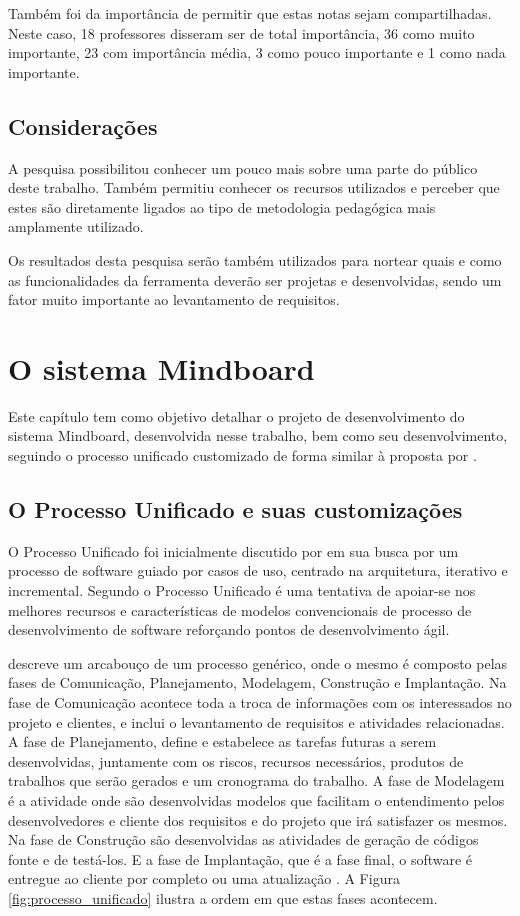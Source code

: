Também foi da importância de permitir que estas notas sejam compartilhadas. Neste caso, 18 professores disseram ser de total importância, 36 como muito importante, 23 com importância média, 3 como pouco importante e 1 como nada importante.

\section{Considerações}

A pesquisa possibilitou conhecer um pouco mais sobre uma parte do público deste trabalho. Também permitiu conhecer os recursos utilizados e perceber que estes são diretamente ligados ao tipo de metodologia pedagógica mais amplamente utilizado.

Os resultados desta pesquisa serão também utilizados para nortear quais e como as funcionalidades da ferramenta deverão ser projetas e desenvolvidas, sendo um fator muito importante ao levantamento de requisitos.


\chapter{O sistema Mindboard}
\label{cap:mindboard}

Este capítulo tem como objetivo detalhar o projeto de desenvolvimento do sistema Mindboard, desenvolvida nesse trabalho, bem como seu desenvolvimento, seguindo o processo unificado customizado de forma similar à proposta por .

\section{O Processo Unificado e suas customizações}

O Processo Unificado foi inicialmente discutido por  em sua busca por um processo de software guiado por casos de uso, centrado na arquitetura, iterativo e incremental. Segundo  o Processo Unificado é uma tentativa de apoiar-se nos melhores recursos e características de modelos convencionais de processo de desenvolvimento de software reforçando pontos de desenvolvimento ágil.

 descreve um arcabouço de um processo genérico, onde o mesmo é composto pelas fases de Comunicação, Planejamento, Modelagem, Construção e Implantação. Na fase de Comunicação acontece toda a troca de informações com os interessados no projeto e clientes, e inclui o levantamento de requisitos e atividades relacionadas. A fase de Planejamento, define e estabelece as tarefas futuras a serem desenvolvidas, juntamente com os riscos, recursos necessários, produtos de trabalhos que serão gerados e um cronograma do trabalho. A fase de Modelagem é a atividade onde são desenvolvidas modelos que facilitam o entendimento pelos desenvolvedores e cliente dos requisitos e do projeto que irá satisfazer os mesmos. Na fase de Construção são desenvolvidas as atividades de geração de códigos fonte e de testá-los. E a fase de Implantação, que é a fase final, o software é entregue ao cliente por completo ou uma atualização \cite{pressman06}. A Figura \ref{fig:processo_unificado} ilustra a ordem em que estas fases acontecem.


